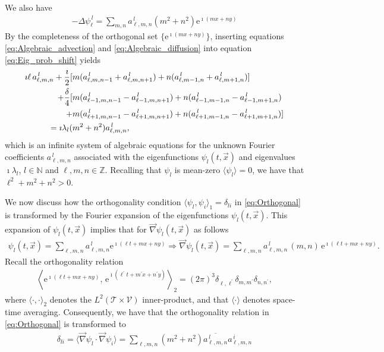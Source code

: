 \documentclass{article}
\newcommand{\e}{\mathrm{e}}
\newcommand{\Tc}{\mathcal{T}}
\newcommand{\Vc}{\mathcal{V}}
\newcommand{\0}{\mathbf{0}}
\newcommand{\1}{\mathbf{1}}
\newcommand{\2}{\mathbf{2}}
\newcommand{\3}{\mathbf{3}}
\newcommand{\4}{\mathbf{4}}
\newcommand{\5}{\mathbf{5}}
\newcommand{\6}{\mathbf{6}}
\newcommand{\7}{\mathbf{7}}
\newcommand{\8}{\mathbf{8}}
\begin{document}
%
We also have 
%
\begin{align}\label{eq:Algebraic_diffusion}
  -\Delta\psi_\ell^{\,l}=\sum_{m,n}a^{\,l}_{\ell,m,n}(m^2+n^2)\e^{\imath (mx+ny)}
\end{align}
%
By the completeness of the orthogonal set $\{\e^{\imath (mx+ny)}\}$, 
inserting equations \eqref{eq:Algebraic_advection} and
\eqref{eq:Algebraic_diffusion} into equation
\eqref{eq:Eig_prob_shift} yields
%
\begin{align}\label{eq:Fourier_Coef_System}
\imath \ell\,a^{\,l}_{\ell,m,n}+\frac{\imath}{2}
[&m(a^{\,l}_{\ell,m,n-1}+a^{\,l}_{\ell,m,n+1})+n(a^{\,l}_{\ell,m-1,n}+a^{\,l}_{\ell,m+1,n})]
\notag\\
+\frac{\delta}{4}[&m(a^{\,l}_{\ell-1,m,n-1}-a^{\,l}_{\ell-1,m,n+1})+n(a^{\,l}_{\ell-1,m-1,n}-a^{\,l}_{\ell-1,m+1,n})
\notag\\
+&m(a^{\,l}_{\ell+1,m,n-1}-a^{\,l}_{\ell+1,m,n+1})+n(a^{\,l}_{\ell+1,m-1,n}-a^{\,l}_{\ell+1,m+1,n})]
\notag\\
=\imath\lambda_l(&m^2+n^2)a^{\,l}_{\ell,m,n},
\end{align}
%
which is an infinite system of algebraic equations for the unknown
Fourier coefficients $a^{\,l}_{\ell,m,n}$ associated with the
eigenfunctions $\psi_l(t,\vec{x})$ and eigenvalues $\imath\lambda_l$,
$l\in\mathbb{N}$ and $\ell,m,n\in\mathbb{Z}$. Recalling that $\psi_l$ is
mean-zero $\langle\psi_l\rangle=0$, we have that $\ell^2+m^2+n^2>0$.




We now discuss how the orthogonality condition
$\langle\psi_l,\psi_i\rangle_1=\delta_{li}$ in \eqref{eq:Orthogonal} is
transformed by the Fourier expansion of the
eigenfunctions $\psi_l(t,\vec{x})$. This expansion of $\psi_l(t,\vec{x})$ 
implies that for $\vec{\nabla}\psi_l(t,\vec{x})$ as follows 
%
\begin{align}\label{eq:Eigenfunction_Grad_expansion}
  \psi_l(t,\vec{x})=\sum_{\ell,m,n}a^{\,l}_{\ell,m,n}\e^{\imath (\ell t+mx+ny)}\Rightarrow
  \vec{\nabla}\psi_l(t,\vec{x})=\sum_{\ell,m,n}a^{\,l}_{\ell,m,n}\,(m,n)\,\e^{\imath (\ell t+mx+ny)}.
\end{align}
%
Recall the orthogonality relation 
%
\begin{align}\label{eq:Trig_orthogonal}  
      \left\langle
      \e^{\imath (\ell t+mx+ny)},\,\e^{\imath (\ell^\prime t+m^\prime x+n^\prime y)}
      \right\rangle_2
      =
      (2\pi)^3\delta_{\ell,\ell^\prime}\delta_{m,m^\prime}\delta_{n,n^\prime},
\end{align}
%
where $\langle\cdot,\cdot\rangle_2$ denotes the $L^2(\Tc\times\Vc)$ inner-product, and that
$\langle\cdot\rangle$ denotes space-time averaging. Consequently, we have that the
orthogonality relation in \eqref{eq:Orthogonal} is transformed to   
%
\begin{align}\label{eq:Ortho_Clmn}
  \delta_{li}=\langle\vec{\nabla}\psi_l\cdot\vec{\nabla}\psi_i\rangle
      = \sum_{\ell,m,n}(m^2+n^2)\overline{a^{\,l}_{\ell,m,n}}a^{\,i}_{\ell,m,n}
\end{align}
%
\end{document}
